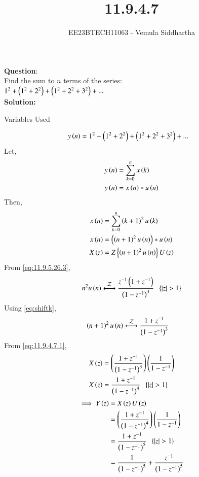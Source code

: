 \documentclass[journal,12pt,twocolumn]{IEEEtran}
\theoremstyle{remark}
\begin{document}

\vspace{3cm}

\title{11.9.4.7}
\author{EE23BTECH11063 - Vemula Siddhartha
}
\maketitle
\newpage
\bigskip

\renewcommand{\thefigure}{\theenumi}
\renewcommand{\thetable}{\theenumi}
\textbf{Question}:\\
Find the sum to $n$ terms of the series:\\
    $1^2+\left(1^2+2^2\right)+\left(1^2+2^2+3^2\right)+...$
    \\
\textbf{Solution:}
\begin{table}[h!]    
    \centering
    
    \caption{Variables Used}
    \label{tab10.5.3.9.1}
  \end{table}
\begin{align}
    y\left(n\right)&=1^2+\left(1^2+2^2\right)+\left(1^2+2^2+3^2\right)+...
\end{align}
Let,
\begin{align}
    y\left(n\right)&=\sum_{k=0}^{n}x\left(k\right)\\
    y\left(n\right)&=x\left(n\right)*u\left(n\right)
\end{align}
Then,
\begin{align}
    x\left(n\right)&=\sum_{k=0}^{n}\left(k+1\right)^2u\left(k\right)\\
    x\left(n\right)&=\left(\left(n+1\right)^2u\left(n\right)\right)*u\left(n\right)\\
    X\left(z\right)&=Z\left\{\left(n+1\right)^2u\left(n\right)\right\}U\left(z\right)
\end{align}
From \eqref{eq:11.9.5.26.3},
\begin{align}
    n^2u\brak{n}\system{Z}\frac{z^{-1}\brak{1+z^{-1}}}{\brak{1-z^{-1}}^3}\;\;\cbrak{\abs{z}>1}
\end{align}
Using \eqref{eq:shiftk},
\begin{align}
    \brak{n+1}^2u\brak{n}&\system{Z}\frac{1+z^{-1}}{\brak{1-z^{-1}}^3}\label{eq:11.9.4.7.1}
\end{align}
From \eqref{eq:11.9.4.7.1},
\begin{align}
    X\left(z\right)&=\left(\frac{1+z^{-1}}{\left(1-z^{-1}\right)^3}\right)\left(\frac{1}{1-z^{-1}}\right)\\
    X\left(z\right)&=\frac{1+z^{-1}}{\left(1-z^{-1}\right)^4}\;\;\left\{\left\vert z\right\vert>1\right\}
\end{align}
\begin{align}
    \implies Y\left(z\right)&=X\left(z\right)U\left(z\right)\\
    &=\left(\frac{1+z^{-1}}{\left(1-z^{-1}\right)^4}\right)\left(\frac{1}{1-z^{-1}}\right)\\
    &=\frac{1+z^{-1}}{\left(1-z^{-1}\right)^5}\;\;\left\{\left\vert z\right\vert>1\right\}\\
    &=\frac{1}{\left(1-z^{-1}\right)^5}+\frac{z^{-1}}{\left(1-z^{-1}\right)^5}
\end{align}
\end{document}
